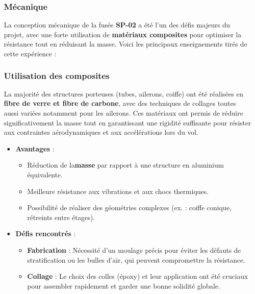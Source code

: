 \subsubsection{Mécanique}
La conception mécanique de la fusée \textbf{SP-02} a été l’un des défis majeurs du projet, avec une forte utilisation de \textbf{matériaux composites} pour optimiser la résistance tout en réduisant la masse. Voici les principaux enseignements tirés de cette expérience :

\subsubsection*{Utilisation des composites}
La majorité des structures porteuses (tubes, ailerons, coiffe) ont été réalisées en \textbf{fibre de verre et fibre de carbone}, avec des techniques de collages toutes aussi variées notamment pour les ailerons. Ces matériaux ont permis de réduire significativement la masse tout en garantissant une rigidité suffisante pour résister aux contraintes aérodynamiques et aux accélérations lors du vol.

\begin{itemize}
    \item \textbf{Avantages} :
    \begin{itemize}
        \item Réduction de la\textbf{masse} par rapport à une structure en aluminium équivalente.
        \item Meilleure résistance aux vibrations et aux chocs thermiques.
        \item Possibilité de réaliser des géométries complexes (ex. : coiffe conique, rétreints entre étages).
    \end{itemize}
    \item \textbf{Défis rencontrés} :
    \begin{itemize}
        \item \textbf{Fabrication} : Nécessité d’un moulage précis pour éviter les défauts de stratification ou les bulles d’air, qui peuvent compromettre la résistance.
        \item \textbf{Collage} : Le choix des colles (époxy) et leur application ont été cruciaux pour assembler rapidement et garder une bonne solidité globale.
    \end{itemize}
\end{itemize}

